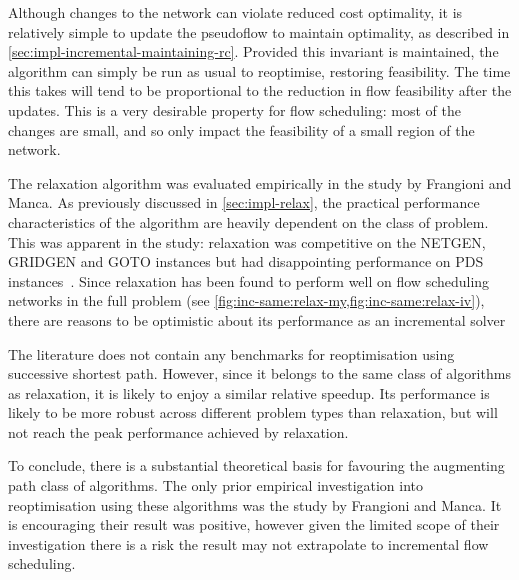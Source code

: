 Although changes to the network can violate reduced cost optimality, it is relatively simple to update the pseudoflow to maintain optimality, as described in \cref{sec:impl-incremental-maintaining-rc}. Provided this invariant is maintained, the algorithm can simply be run as usual to reoptimise, restoring feasibility. The time this takes will tend to be proportional to the reduction in flow feasibility after the updates\footnotemark. This is a very desirable property for flow scheduling: most of the changes are small, and so only impact the feasibility of a small region of the network.

The relaxation algorithm was evaluated empirically in the study by Frangioni and Manca. As previously discussed in \cref{sec:impl-relax}, the practical performance characteristics of the algorithm are heavily dependent on the class of problem. This was apparent in the study: relaxation was competitive on the NETGEN, GRIDGEN and GOTO instances but had disappointing performance on PDS instances~\cite[tables~1~to~4]{Frangioni:2006}. Since relaxation has been found to perform well on flow scheduling networks in the full problem (see \cref{fig:inc-same:relax-my,fig:inc-same:relax-iv}), there are reasons to be optimistic about its performance as an incremental solver

The literature does not contain any benchmarks for reoptimisation using successive shortest path. However, since it belongs to the same class of algorithms as relaxation, it is likely to enjoy a similar relative speedup. Its performance is likely to be more robust across different problem types than relaxation, but will not reach the peak performance achieved by relaxation.

To conclude, there is a substantial theoretical basis for favouring the augmenting path class of algorithms. The only prior empirical investigation into reoptimisation using these algorithms was the study by Frangioni and Manca. It is encouraging their result was positive, however given the limited scope of their investigation there is a risk the result may not extrapolate to incremental flow scheduling.

